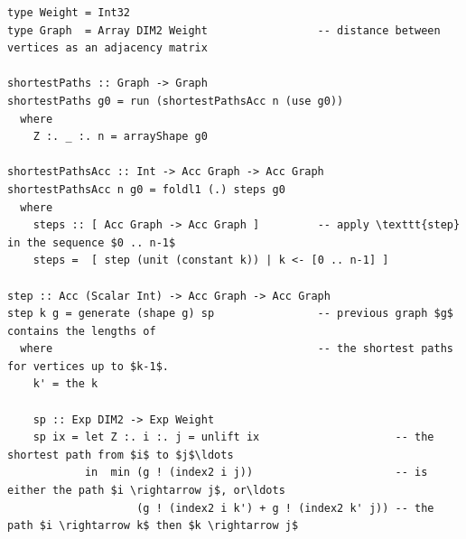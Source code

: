 \begin{lstlisting}[style=haskell_float
    ,label=lst:floyd_warshall
    ,caption={[Floyd-Warshall shortest-paths algorithm]
        Floyd-Warshall shortest-paths algorithm~\cite{Marlow:2013wn}}]
type Weight = Int32
type Graph  = Array DIM2 Weight                 -- distance between vertices as an adjacency matrix

shortestPaths :: Graph -> Graph
shortestPaths g0 = run (shortestPathsAcc n (use g0))
  where
    Z :. _ :. n = arrayShape g0

shortestPathsAcc :: Int -> Acc Graph -> Acc Graph
shortestPathsAcc n g0 = foldl1 (.) steps g0
  where
    steps :: [ Acc Graph -> Acc Graph ]         -- apply \texttt{step} in the sequence $0 .. n-1$
    steps =  [ step (unit (constant k)) | k <- [0 .. n-1] ]

step :: Acc (Scalar Int) -> Acc Graph -> Acc Graph
step k g = generate (shape g) sp                -- previous graph $g$ contains the lengths of
  where                                         -- the shortest paths for vertices up to $k-1$.
    k' = the k

    sp :: Exp DIM2 -> Exp Weight
    sp ix = let Z :. i :. j = unlift ix                     -- the shortest path from $i$ to $j$\ldots
            in  min (g ! (index2 i j))                      -- is either the path $i \rightarrow j$, or\ldots
                    (g ! (index2 i k') + g ! (index2 k' j)) -- the path $i \rightarrow k$ then $k \rightarrow j$
\end{lstlisting}

